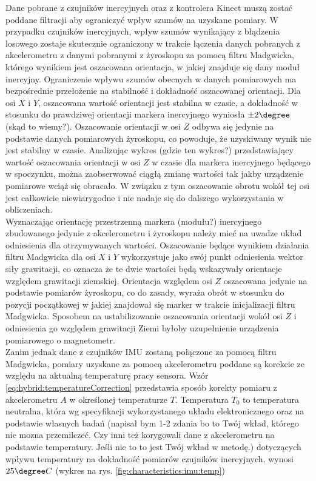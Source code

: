 Dane pobrane z czujników inercyjnych oraz z kontrolera Kinect muszą zostać poddane filtracji aby ograniczyć wpływ szumów na uzyskane pomiary. W przypadku czujników inercyjnych, wpływ szumów wynikający z błądzenia losowego zostaje skutecznie ograniczony w trakcie łączenia danych pobranych z akcelerometru z danymi pobranymi z żyroskopu za pomocą filtru Madgwicka, którego wynikiem jest oszacowana orientacja, w jakiej znajduje się dany moduł inercyjny. Ograniczenie wpływu szumów obecnych w danych pomiarowych ma bezpośrednie przełożenie na stabilność i dokładność oszacowanej orientacji. Dla osi $X$ i $Y$, oszacowana wartość orientacji jest stabilna w czasie, a dokładność w stosunku do prawdziwej orientacji markera inercyjnego wyniosła $\pm 2\degree$ (skąd to wiemy?). Oszacowanie orientacji w osi $Z$ odbywa się jedynie na podstawie danych pomiarowych żyroskopu, co powoduje, że uzyskiwany wynik nie jest stabilny w czasie. Analizując wykres (gdzie ten wykres?) przedstawiający wartość oszacowania orientacji w osi $Z$ w czasie dla markera inercyjnego będącego w spoczynku, można zaobserwować ciągłą zmianę wartości tak jakby urządzenie pomiarowe wciąż się obracało. W związku z tym oszacowanie obrotu wokół tej osi jest całkowicie niewiarygodne i nie nadaje się do dalszego wykorzystania w obliczeniach. \\
Wyznaczając orientację przestrzenną markera (modułu?) inercyjnego zbudowanego jedynie z akcelerometru i żyroskopu należy mieć na uwadze układ odniesienia dla otrzymywanych wartości. Oszacowanie będące wynikiem działania filtru Madgwicka dla osi $X$ i $Y$ wykorzystuje jako swój punkt odniesienia wektor siły grawitacji, co oznacza że te dwie wartości będą wskazywały orientacje względem grawitacji ziemskiej. Orientacja względem osi $Z$ oszacowana jedynie na podstawie pomiarów żyroskopu, co do zasady, wyraża obrót w stosunku do pozycji początkowej w jakiej znajdował się marker w trakcie inicjalizacji filtru Madgwicka. Sposobem na ustabilizowanie oszacowania orientacji wokół osi $Z$ i odniesienia go względem grawitacji Ziemi byłoby uzupełnienie urządzenia pomiarowego o magnetometr. \\
Zanim jednak dane z czujników IMU zostaną połączone za pomocą filtru Madgwicka, pomiary uzyskane za pomocą akcelerometru poddane są korekcie ze względu na aktualną temperaturę pracy sensora. Wzór \eqref{eq:hybrid:temperatureCorrection} przedstawia sposób korekty pomiaru z akcelerometru  $A$ w określonej temperaturze $T$. Temperatura $T_0$ to temperatura neutralna, która wg specyfikacji wykorzystanego układu elektronicznego oraz na podstawie własnych badań (napisał bym 1-2 zdania bo to Twój wkład, którego nie mozna przemilczeć. Czy inni też korygowali dane z akcelerometru na podstawie temperatury. Jeśli nie to to jest Twój wkład w metodę.) dotyczących wpływu temperatury na dokładność pomiarów czujników inercyjnych, wynosi $25\degree C$ (wykres na rys. \ref{fig:characteristics:imu:temp})

